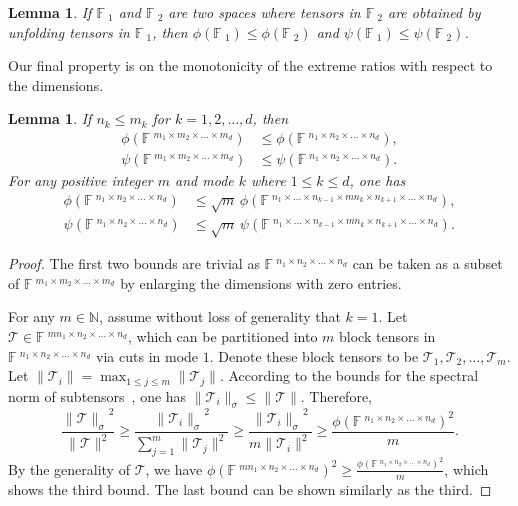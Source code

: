 \documentclass[11pt]{article}
\newtheorem{lemma}[theorem]{Lemma}
\newcommand{\N}{\mathbb{N}}
\newcommand{\BF}{\mathbb{F}\:\!}
\newcommand{\TT}{\mathcal{T}}
\begin{document}
\begin{lemma}\label{thm:fold2}
If $\BF_1$ and $\BF_2$ are two spaces where tensors in $\BF_2$ are obtained by unfolding tensors in $\BF_1$, then $\phi(\BF_1)\le \phi(\BF_2)$ and $\psi(\BF_1)\le \psi(\BF_2)$.
\end{lemma}

Our final property is on the monotonicity of the extreme ratios with respect to the dimensions.
\begin{lemma}\label{thm:mono}
If $n_k\le m_k$ for $k=1,2,\dots,d$, then
\begin{align*} \phi(\BF^{m_1\times m_2\times\dots\times m_d}) &\le \phi(\BF^{n_1\times n_2\times\dots\times n_d}), \\
 \psi(\BF^{m_1\times m_2\times\dots\times m_d}) &\le \psi(\BF^{n_1\times n_2\times\dots\times n_d}).
\end{align*}
For any positive integer $m$ and mode $k$ where $1\le k\le d$, one has
\begin{align*}
    \phi(\BF^{n_1\times n_2\times\dots\times n_d})&\le
{\sqrt{m}}\,\phi(\BF^{n_1\times \dots \times n_{k-1}\times mn_k \times n_{k+1}\times \dots\times n_d}), \\
\psi(\BF^{n_1\times n_2\times\dots\times n_d})& \le
{\sqrt{m}}\,\psi(\BF^{n_1\times \dots \times n_{k-1}\times mn_k \times n_{k+1}\times \dots\times n_d}).
\end{align*}
\end{lemma}
\begin{proof}
The first two bounds are trivial as $\BF^{n_1\times n_2\times\dots\times n_d}$ can be taken as a subset of $\BF^{m_1\times m_2\times\dots\times m_d}$ by enlarging the dimensions with zero entries.

For any $m\in\N$, assume without loss of generality that $k=1$. Let $\TT\in\BF^{mn_1\times n_2\times\dots\times n_d}$, which can be partitioned into $m$ block tensors in $\BF^{n_1\times n_2\times\dots\times n_d}$ via cuts in mode $1$. Denote these block tensors to be $\TT_1,\TT_2,\dots,\TT_m$. Let $\|\TT_i\|=\max_{1\le j\le m}\|\TT_j\|$. According to the bounds for the spectral norm of subtensors~\cite[Theorem 3.1]{L16}, one has $\|\TT_i\|_\sigma\le\|\TT\|$. Therefore,
$$
\frac{{\|\TT\|_\sigma}^2}{\|\TT\|^2}\ge \frac{{\|\TT_i\|_\sigma}^2}{\sum_{j=1}^m\|\TT_j\|^2}\ge \frac{{\|\TT_i\|_\sigma}^2}{m\|\TT_i\|^2}\ge \frac{\phi(\BF^{n_1\times n_2\times\dots\times n_d})^2}{m}.
$$
By the generality of $\TT$, we have $\phi(\BF^{mn_1\times n_2\times\dots\times n_d})^2\ge \frac{\phi(\BF^{n_1\times n_2\times\dots\times n_d})^2}{m}$, which shows the third bound. The last bound can be shown similarly as the third.
\end{proof}
\end{document}
